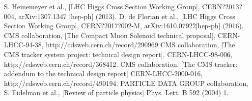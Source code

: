\begin{thebibliography}{999}
		 S. Heinemeyer et al., [LHC Higgs Cross Section Working Group], CERN?2013?004, arXiv:1307.1347 [hep-ph] (2013).
		 D. de Florian et al., [LHC Higgs Cross Section Working Group], CERN?2017?002-M, arXiv:1610.07922[hep-ph] (2016).
		 CMS collaboration, [The Compact Muon Solenoid technical proposal], CERN-LHCC-94-38, http://cdsweb.cern.ch/record/290969
		  CMS collaboration, [The CMS tracker system project: technical design report], CERN-LHCC-98-006, http://cdsweb.cern.ch/record/368412.
		  CMS collaboration, [The CMS tracker: addendum to the technical design report] CERN-LHCC-2000-016, http://cdsweb.cern.ch/record/490194.
		 PARTICLE DATA GROUP collaboration, S. Eidelman et al., [Review of particle physics] Phys. Lett. B 592 (2004) 1.
				
           	  
	 
	 \end{thebibliography}
\clearpage{\pagestyle{empty}\cleardoublepage}